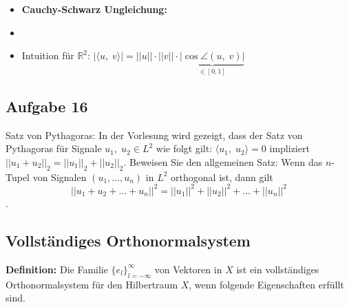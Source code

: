 \documentclass[11pt]{article}
\begin{document}
\begin{itemize}[leftmargin=0pt]

    \item[] \textbf{Cauchy-Schwarz Ungleichung:}
    \item[] 
    \item[] Intuition für $\mathbb{R}^2$: \hspace{10pt} $\left| \langle u, \; v \rangle \right| = ||u|| \cdot ||v|| \cdot \underbrace{\left| \cos \angle(u, \; v) \right|}_{\in [0,1]}$
\end{itemize}

\vspace*{-1.5cm}
\subsection*{Aufgabe 16}
\vspace*{-0.5cm}
Satz von Pythagoras: In der Vorlesung wird gezeigt, dass der Satz von Pythagoras für Signale $u_1, \; u_2 \in L^2$ wie folgt gilt: $\langle u_1, \; u_2 \rangle = 0$ impliziert $||u_1 + u_2||_2 = ||u_1||_2 + ||u_2||_2$. Beweisen Sie den allgemeinen Satz: Wenn das $n$-Tupel von Signalen $(u_1, \dots, u_n)$ in $L^2$ orthogonal ist, dann gilt
$$||u_1 + u_2 + \dots + u_n||^2 = ||u_1||^2 + ||u_2||^2 + \dots + ||u_n||^2$$.

\vspace*{-0.5cm}

\pagebreak

\subsection*{Vollständiges Orthonormalsystem}
\vspace*{-0.5cm}
\textbf{Definition:} Die Familie $\{e_l\}_{l = -\infty}^\infty$ von Vektoren in $X$ ist ein vollständiges Orthonormalsystem für den Hilbertraum $X$, wenn folgende Eigenschaften erfüllt sind.
\end{document}
